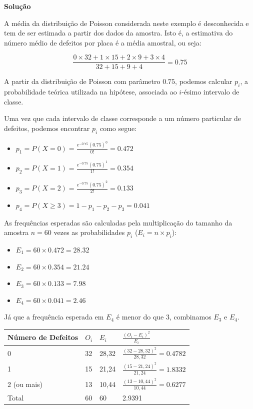 \documentclass[
]{book}
\providecommand{\tightlist}{%
  \setlength{\itemsep}{0pt}\setlength{\parskip}{0pt}}
\begin{document}
\textbf{Solução}

A média da distribuição de Poisson considerada neste exemplo é desconhecida e tem de ser estimada a partir dos dados da amostra. Isto é, a estimativa do número médio de defeitos por placa é a média amostral, ou seja:

\[\frac{0\times32+1\times15+2\times9+3\times4}{32+15+9+4}=0.75\]

A partir da distribuição de Poisson com parâmetro \(0.75\), podemos calcular \(p_i\), a probabilidade teórica utilizada na hipótese, associada ao \(i\)-ésimo intervalo de classe.

Uma vez que cada intervalo de classe corresponde a um número particular de defeitos, podemos encontrar \(p_i\) como segue:

\begin{itemize}
\tightlist
\item
  \(p_1=P(X=0)=\frac{e^{-0.75}(0.75)^0}{0!}=0.472\)
\item
  \(p_2=P(X=1)=\frac{e^{-0.75}(0.75)^1}{1!}=0.354\)
\item
  \(p_3=P(X=2)=\frac{e^{-0.75}(0.75)^2}{2!}=0.133\)
\item
  \(p_4=P(X\geq3)=1-p_1-p_2-p_3=0.041\)
\end{itemize}

As frequências esperadas são calculadas pela multiplicação do tamanho da amostra \(n=60\) vezes as probabilidades \(p_i\) (\(E_i=n\times p_i\)):

\begin{itemize}
\tightlist
\item
  \(E_1=60\times0.472=28.32\)
\item
  \(E_2=60\times0.354=21.24\)
\item
  \(E_3=60\times0.133=7.98\)
\item
  \(E_4=60\times0.041=2.46\)
\end{itemize}

Já que a frequência esperada em \(E_4\) é menor do que 3, combinamos \(E_3\) e \(E_4\).

\begin{longtable}[]{@{}llll@{}}
\toprule
Número de Defeitos & \(O_i\) & \(E_i\) & \(\frac{(O_i-E_i)^2}{E_i}\) \\
\midrule
\endhead
0 & 32 & 28,32 & \(\frac{(32-28,32)^2}{28,32}=0.4782\) \\
1 & 15 & 21,24 & \(\frac{(15-21,24)^2}{21,24}=1.8332\) \\
2 (ou mais) & 13 & 10,44 & \(\frac{(13-10,44)^2}{10,44}=0.6277\) \\
Total & 60 & 60 & 2.9391 \\
\bottomrule
\end{longtable}
\end{document}
